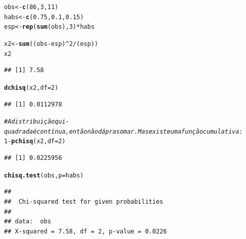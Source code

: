 \documentclass{beamer}\usepackage[]{graphicx}\usepackage[]{color}
\makeatletter
\newcommand{\hlnum}[1]{\textcolor[rgb]{0.686,0.059,0.569}{#1}}%
\newcommand{\hlcom}[1]{\textcolor[rgb]{0.678,0.584,0.686}{\textit{#1}}}%
\newcommand{\hlopt}[1]{\textcolor[rgb]{0,0,0}{#1}}%
\newcommand{\hlstd}[1]{\textcolor[rgb]{0.345,0.345,0.345}{#1}}%
\newcommand{\hlkwb}[1]{\textcolor[rgb]{0.69,0.353,0.396}{#1}}%
\newcommand{\hlkwc}[1]{\textcolor[rgb]{0.333,0.667,0.333}{#1}}%
\newcommand{\hlkwd}[1]{\textcolor[rgb]{0.737,0.353,0.396}{\textbf{#1}}}%
\newenvironment{kframe}{%
 \def\at@end@of@kframe{}%
 \ifinner\ifhmode%
  \def\at@end@of@kframe{\end{minipage}}%
  \begin{minipage}{\columnwidth}%
 \fi\fi%
 \def\FrameCommand##1{\hskip\@totalleftmargin \hskip-\fboxsep
 \colorbox{shadecolor}{##1}\hskip-\fboxsep
     \hskip-\linewidth \hskip-\@totalleftmargin \hskip\columnwidth}%
 \MakeFramed {\advance\hsize-\width
   \@totalleftmargin\z@ \linewidth\hsize
   \@setminipage}}%
 {\par\unskip\endMakeFramed%
 \at@end@of@kframe}
\newenvironment{knitrout}{}{} %
\renewenvironment{knitrout}{\setlength{\topsep}{0mm}}{}
\makeatother
\begin{document}
\begin{frame}[fragile]

\begin{knitrout}\tiny
{}\color{fgcolor}\begin{kframe}
\begin{alltt}
\hlstd{obs} \hlkwb{<-} \hlkwd{c}\hlstd{(}\hlnum{86}\hlstd{,}\hlnum{3}\hlstd{,}\hlnum{11}\hlstd{)}
\hlstd{habs} \hlkwb{<-} \hlkwd{c}\hlstd{(}\hlnum{0.75}\hlstd{,}\hlnum{0.1}\hlstd{,}\hlnum{0.15}\hlstd{)}
\hlstd{esp} \hlkwb{<-} \hlkwd{rep}\hlstd{(}\hlkwd{sum}\hlstd{(obs),}\hlnum{3}\hlstd{)} \hlopt{*} \hlstd{habs}

\hlstd{x2} \hlkwb{<-} \hlkwd{sum}\hlstd{((obs}\hlopt{-}\hlstd{esp)}\hlopt{^}\hlnum{2}\hlopt{/}\hlstd{(esp))}
\hlstd{x2}
\end{alltt}
\begin{verbatim}
## [1] 7.58
\end{verbatim}
\begin{alltt}
\hlkwd{dchisq}\hlstd{(x2,}\hlkwc{df}\hlstd{=}\hlnum{2}\hlstd{)}
\end{alltt}
\begin{verbatim}
## [1] 0.0112978
\end{verbatim}
\begin{alltt}
\hlcom{# A distribuição qui-quadrada é contínua, então não dá pra somar. Mas existe uma função cumulativa:}
\hlnum{1}\hlopt{-}\hlkwd{pchisq}\hlstd{(x2,}\hlkwc{df}\hlstd{=}\hlnum{2}\hlstd{)}
\end{alltt}
\begin{verbatim}
## [1] 0.0225956
\end{verbatim}
\begin{alltt}
\hlkwd{chisq.test}\hlstd{(obs,}\hlkwc{p}\hlstd{=habs)}
\end{alltt}
\begin{verbatim}
## 
## 	Chi-squared test for given probabilities
## 
## data:  obs
## X-squared = 7.58, df = 2, p-value = 0.0226
\end{verbatim}
\end{kframe}
\end{knitrout}

\end{frame} 
\end{document}
